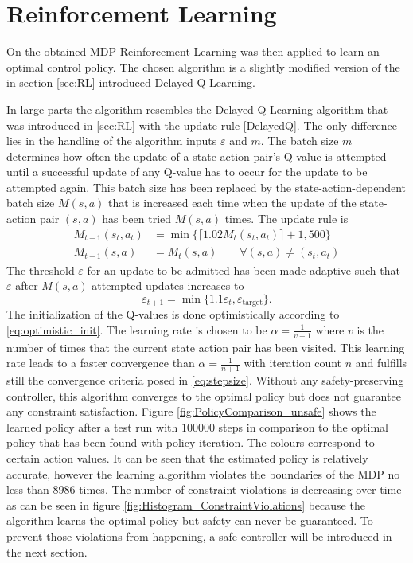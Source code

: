\documentclass[../main.tex]{subfiles}
\begin{document}
\section{Reinforcement Learning}
On the obtained MDP Reinforcement Learning was then applied to learn an optimal control policy. The chosen algorithm is a slightly modified version of the in section \ref{sec:RL} introduced Delayed Q-Learning. 

In large parts the algorithm resembles the Delayed Q-Learning algorithm that was introduced in \ref{sec:RL} with the update rule \eqref{DelayedQ}. The only difference lies in the handling of the algorithm inputs $\varepsilon$ and $m$. The batch size $m$ determines how often the update of a state-action pair's Q-value is attempted until a successful update of any Q-value has to occur for the update to be attempted again. This batch size has been replaced by the state-action-dependent batch size $M(s,a)$ that is increased each time when the update of the state-action pair $(s,a)$ has been tried $M(s,a)$ times. The update rule is 
\begin{align}
    M_{t+1}(s_t,a_t) &= \min\{\lceil1.02M_t(s_t,a_t)\rceil+1, 500\}\\
    M_{t+1}(s,a) &= M_t(s,a) \qquad \forall (s,a) \neq (s_t,a_t)
\end{align}
The threshold $\varepsilon$ for an update to be admitted has been made adaptive such that $\varepsilon$ after $M(s,a)$ attempted updates increases to 
\begin{equation}
    \varepsilon_{t+1} = \min\{1.1 \varepsilon_t, \varepsilon_{\text{target}}\}.
\end{equation}
The initialization of the Q-values is done optimistically according to \eqref{eq:optimistic_init}. The learning rate is chosen to be $\alpha = \frac{1}{v+1}$ where $v$ is the number of times that the current state action pair has been visited. This learning rate leads to a faster convergence than $\alpha = \frac{1}{n+1}$ with iteration count $n$ and fulfills still the convergence criteria posed in \eqref{eq:stepsize}. Without any safety-preserving controller, this algorithm converges to the optimal policy but does not guarantee any constraint satisfaction. Figure \ref{fig:PolicyComparison_unsafe} shows the learned policy after a test run with $100000$ steps in comparison to the optimal policy that has been found with policy iteration. The colours correspond to certain action values. It can be seen that the estimated policy is relatively accurate, however the learning algorithm violates the boundaries of the MDP no less than $8986$ times. The number of constraint violations is decreasing over time as can be seen in figure \ref{fig:Histogram_ConstraintViolations} because the algorithm learns the optimal policy but safety can never be guaranteed. To prevent those violations from happening, a safe controller will be introduced in the next section.
\end{document}
